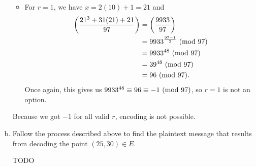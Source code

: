 \documentclass[letterpaper]{article}
\begin{document}
\begin{mdframed}
\begin{enumerate}[(a)]
\begin{mdframed}
\begin{itemize}
                \item For $r = 1$, we have $x = 2(10) + 1 = 21$ and 
                \begin{equation*}
                    \begin{aligned}
                        \left(\frac{21^3 + 31(21) + 21}{97}\right) &= \left(\frac{9933}{97}\right) \\ 
                            &= 9933^{\frac{97 - 1}{2}} \ (\mathrm{mod}\ 97) \\ 
                            &= 9933^{48} \ (\mathrm{mod}\ 97) \\ 
                            &= 39^{48} \ (\mathrm{mod}\ 97) \\ 
                            &= 96 \ (\mathrm{mod}\ 97).
                    \end{aligned}
                \end{equation*}
                Once again, this gives us $9933^{48} \equiv 96 \equiv -1 \ (\mathrm{mod}\ 97)$, so $r = 1$ is not an option. 
            \end{itemize}
            Because we got $-1$ for all valid $r$, encoding is not possible.  
        \end{mdframed}
        \item Follow the process described above to find the plaintext message that results from decoding the point $(25, 30) \in E$.
        \begin{mdframed}
            TODO %
        \end{mdframed}
    \end{enumerate}
\end{mdframed}
\end{document}
